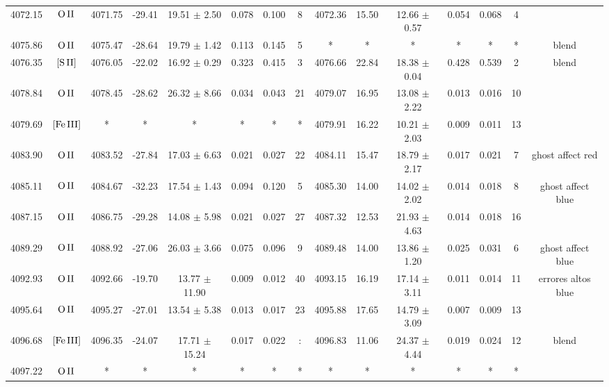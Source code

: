 \documentclass{article}
\begin{document}
\begin{table*}
\begin{adjustbox}{width=\textwidth}
\begin{tabular}{ccccccccccccccc}
4072.15 & $\mbox{O}\thinspace \mbox{II}$ & 4071.75 & -29.41 & 19.51 $\pm$ 2.50 & 0.078 & 0.100 & 8 & 4072.36 & 15.50 & 12.66 $\pm$ 0.57 & 0.054 & 0.068 & 4 &  \\
4075.86 & $\mbox{O}\thinspace \mbox{II}$ & 4075.47 & -28.64 & 19.79 $\pm$ 1.42 & 0.113 & 0.145 & 5 & * & * & * & * & * & * &  blend \\
4076.35 & $\mbox{[S}\thinspace \mbox{II]}$ & 4076.05 & -22.02 & 16.92 $\pm$ 0.29 & 0.323 & 0.415 & 3 & 4076.66 & 22.84 & 18.38 $\pm$ 0.04 & 0.428 & 0.539 & 2 &  blend \\
4078.84 & $\mbox{O}\thinspace \mbox{II}$ & 4078.45 & -28.62 & 26.32 $\pm$ 8.66 & 0.034 & 0.043 & 21 & 4079.07 & 16.95 & 13.08 $\pm$ 2.22 & 0.013 & 0.016 & 10 &  \\
4079.69 & $\mbox{[Fe}\thinspace \mbox{III]}$ & * & * & * & * & * & * & 4079.91 & 16.22 & 10.21 $\pm$ 2.03 & 0.009 & 0.011 & 13 &  \\
4083.90 & $\mbox{O}\thinspace \mbox{II}$ & 4083.52 & -27.84 & 17.03 $\pm$ 6.63 & 0.021 & 0.027 & 22 & 4084.11 & 15.47 & 18.79 $\pm$ 2.17 & 0.017 & 0.021 & 7 &  ghost affect red \\
4085.11 & $\mbox{O}\thinspace \mbox{II}$ & 4084.67 & -32.23 & 17.54 $\pm$ 1.43 & 0.094 & 0.120 & 5 & 4085.30 & 14.00 & 14.02 $\pm$ 2.02 & 0.014 & 0.018 & 8 &  ghost affect blue \\
4087.15 & $\mbox{O}\thinspace \mbox{II}$ & 4086.75 & -29.28 & 14.08 $\pm$ 5.98 & 0.021 & 0.027 & 27 & 4087.32 & 12.53 & 21.93 $\pm$ 4.63 & 0.014 & 0.018 & 16 &  \\
4089.29 & $\mbox{O}\thinspace \mbox{II}$ & 4088.92 & -27.06 & 26.03 $\pm$ 3.66 & 0.075 & 0.096 & 9 & 4089.48 & 14.00 & 13.86 $\pm$ 1.20 & 0.025 & 0.031 & 6 &  ghost affect blue \\
4092.93 & $\mbox{O}\thinspace \mbox{II}$ & 4092.66 & -19.70 & 13.77 $\pm$ 11.90 & 0.009 & 0.012 & 40 & 4093.15 & 16.19 & 17.14 $\pm$ 3.11 & 0.011 & 0.014 & 11 &  errores altos blue \\
4095.64 & $\mbox{O}\thinspace \mbox{II}$ & 4095.27 & -27.01 & 13.54 $\pm$ 5.38 & 0.013 & 0.017 & 23 & 4095.88 & 17.65 & 14.79 $\pm$ 3.09 & 0.007 & 0.009 & 13 &  \\
4096.68 & $\mbox{[Fe}\thinspace \mbox{III]}$ & 4096.35 & -24.07 & 17.71 $\pm$ 15.24 & 0.017 & 0.022 & : & 4096.83 & 11.06 & 24.37 $\pm$ 4.44 & 0.019 & 0.024 & 12 &  blend \\
4097.22 & $\mbox{O}\thinspace \mbox{II}$ & * & * & * & * & * & * & * & * & * & * & * & * &  \\

\end{tabular}
\end{adjustbox}
\end{table*}
\end{document}
